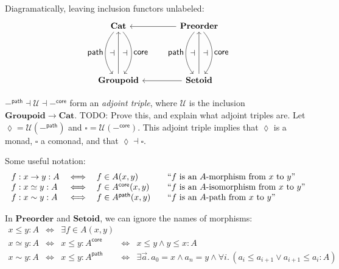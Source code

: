 \documentclass{article}
\newcommand{\todo}[1]{{\color{red}#1}}
\newcommand{\ms}[1]{\ensuremath{\mathsf{#1}}}
\newcommand{\mb}[1]{\ensuremath{\mathbf{#1}}}
\newcommand{\mc}[1]{\ensuremath{\mathcal{#1}}}
\newcommand{\binder}{.\,}
\newcommand{\bind}[1]{{#1}\binder}
\newcommand{\iso}{\ms{core}}
\renewcommand{\path}{\ms{path}}
\newcommand{\isoto}{\simeq}
\newcommand{\pathto}{\sim}
\begin{document}
Diagramatically, leaving inclusion functors unlabeled:
{\large\[
  \tikzset{
    no line/.style={draw=none,
      commutative diagrams/every label/.append style={/tikz/auto=false}}}
  \begin{tikzcd}[row sep=5em,column sep=4em]
    \mb{Cat}
    \arrow[d,bend right=40,"\textstyle\path"'{name=A}]
    \arrow[d,bend left=40,"\textstyle\iso"{name=C}]
    & \mb{Preorder}
    \arrow[d,bend right=40,"\textstyle\path"'{name=A2}]
    \arrow[d,bend left=40,"\textstyle\iso"{name=C2}]
    \arrow[l]
    \\
    \mb{Groupoid} \arrow[u,""{name=B}]
    & \mb{Setoid} \arrow{u}[name=B2]{} \arrow[l]
    \arrow[to path={(A) -- (B)\tikztonodes}, no line, near end]{}{\displaystyle\dashv}
    \arrow[to path={(B) -- (C)\tikztonodes}, no line]{}{\displaystyle\dashv}
    \arrow[to path={(A2) -- (B2)\tikztonodes}, no line, near end]{}{\displaystyle\dashv}
    \arrow[to path={(B2) -- (C2)\tikztonodes}, no line]{}{\displaystyle\dashv}
  \end{tikzcd}
\]}

$-^\path \dashv \mc{U} \dashv -^\iso$ form an \emph{adjoint triple}, where
$\mc{U}$ is the inclusion $\mb{Groupoid} \to \mb{Cat}$. \todo{TODO:
  Prove this, and explain what adjoint triples are.}
%
Let $\lozenge = \mc{U}(-^\path)$ and $\square = \mc{U}(-^\iso)$. This adjoint
triple implies that $\lozenge$ is a monad, $\square$ a comonad, and that
$\lozenge \dashv \square$.

Some useful notation:
\[\begin{array}{lcl@{\hskip 2em}l}
  f : x \to y : A &\iff& f \in A(x,y)
  & \text{``$f$ is an $A$-morphism from $x$ to $y$''}\\
  f : x \simeq y : A &\iff& f \in A^\iso(x,y)
  & \text{``$f$ is an $A$-isomorphism from $x$ to $y$''}\\
  f : x \pathto y : A &\iff& f \in A^\path(x,y)
  & \text{``$f$ is an $A$-path from $x$ to $y$''}
\end{array}\]

In $\mb{Preorder}$ and $\mb{Setoid}$, we can ignore the names of morphisms:
\[\begin{array}{lclcl}
  x \le y : A &\iff& \exists f \in A(x,y)\\
  x \isoto y : A &\iff& x \le y : A^\iso &\iff& x \le y \wedge y \le x : A\\
  x \pathto y : A &\iff& x \le y : A^\path
  &\iff& \exists\bind{\vec{a}} a_0 = x \wedge a_n = y
  \wedge \forall\bind{i} (a_i \le a_{i+1} \vee a_{i+1} \le a_i : A)
\end{array}\]
\end{document}
